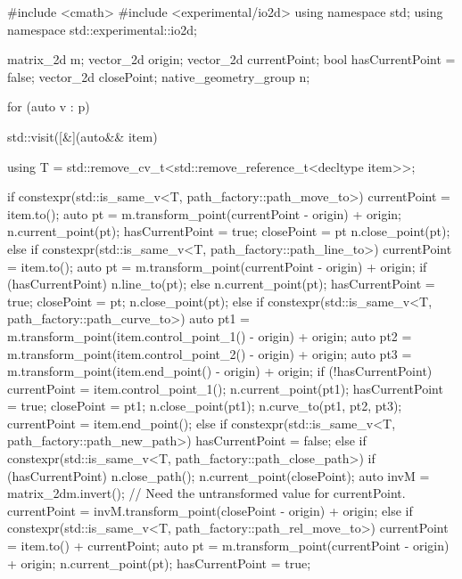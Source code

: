 \begin{codeblock}
  #include <cmath>
  #include <experimental/io2d>
  using namespace std;
  using namespace std::experimental::io2d;
  
  matrix_2d m;
  vector_2d origin;
  vector_2d currentPoint;
  bool hasCurrentPoint = false;
  vector_2d closePoint;
  native_geometry_group n;
  
  for (auto v : p) {
    std::visit([&](auto&& item) {
      using T = std::remove_cv_t<std::remove_reference_t<decltype item>>;

      if constexpr(std::is_same_v<T, path_factory::path_move_to>) {
        currentPoint = item.to();
        auto pt = m.transform_point(currentPoint - origin) + origin;
        n.current_point(pt);
        hasCurrentPoint = true;
        closePoint = pt
        n.close_point(pt);
      }
      else if constexpr(std::is_same_v<T, path_factory::path_line_to>) {
        currentPoint = item.to();
        auto pt = m.transform_point(currentPoint - origin) + origin;
        if (hasCurrentPoint) {
          n.line_to(pt);
        }
        else {
          n.current_point(pt);
          hasCurrentPoint = true;
          closePoint = pt;
          n.close_point(pt);
        }
      }
      else if constexpr(std::is_same_v<T, path_factory::path_curve_to>) {
        auto pt1 = m.transform_point(item.control_point_1() - origin) + origin;
        auto pt2 = m.transform_point(item.control_point_2() - origin) + origin;
        auto pt3 = m.transform_point(item.end_point() - origin) + origin;
        if (!hasCurrentPoint) {
          currentPoint = item.control_point_1();
          n.current_point(pt1);
          hasCurrentPoint = true;
          closePoint = pt1;
          n.close_point(pt1);
        }
        n.curve_to(pt1, pt2, pt3);
        currentPoint = item.end_point();
      }
      else if constexpr(std::is_same_v<T, path_factory::path_new_path>) {
        hasCurrentPoint = false;
      }
      else if constexpr(std::is_same_v<T, path_factory::path_close_path>) {
        if (hasCurrentPoint) {
          n.close_path();
          n.current_point(closePoint);
          auto invM = matrix_2d{m}.invert();
          // Need the untransformed value for currentPoint.
          currentPoint = invM.transform_point(closePoint - origin) + origin;
        }
      }
      else if constexpr(std::is_same_v<T, path_factory::path_rel_move_to>) {
        currentPoint = item.to() + currentPoint;
        auto pt = m.transform_point(currentPoint - origin) + origin;
        n.current_point(pt);
        hasCurrentPoint = true;
}}}
\end{codeblock}
